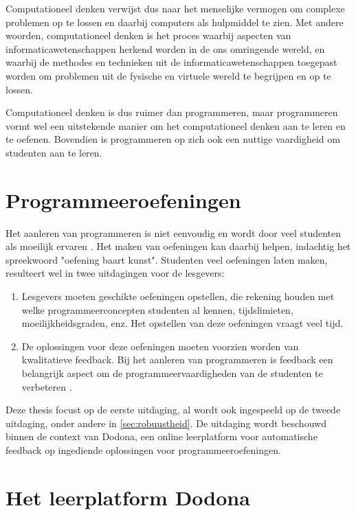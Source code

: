 \begin{displayquote}
    Computationeel denken verwijst dus naar het menselijke vermogen om complexe problemen op te lossen en daarbij computers als hulpmiddel te zien.
    Met andere woorden, computationeel denken is het proces waarbij aspecten van informaticawetenschappen herkend worden in de ons omringende wereld, en waarbij de methodes en technieken uit de informaticawetenschappen toegepast worden om problemen uit de fysische en virtuele wereld te begrijpen en op te lossen.
\end{displayquote}

Computationeel denken is dus ruimer dan programmeren, maar programmeren vormt wel een uitstekende manier om het computationeel denken aan te leren en te oefenen.
Bovendien is programmeren op zich ook een nuttige vaardigheid om studenten aan te leren.

\section{Programmeeroefeningen}\label{sec:programmeeroefeningen}

Het aanleren van programmeren is niet eenvoudig en wordt door veel studenten als moeilijk ervaren \autocite{10.1145/3293881.3295779}.
Het maken van oefeningen kan daarbij helpen, indachtig het spreekwoord "oefening baart kunst".
Studenten veel oefeningen laten maken, resulteert wel in twee uitdagingen voor de lesgevers:
\begin{enumerate}
    \item Lesgevers moeten geschikte oefeningen opstellen, die rekening houden met welke programmeerconcepten studenten al kennen, tijdslimieten, moeilijkheidsgraden, enz.
    Het opstellen van deze oefeningen vraagt veel tijd.
    \item De oplossingen voor deze oefeningen moeten voorzien worden van kwalitatieve feedback.
    Bij het aanleren van programmeren is feedback een belangrijk aspect om de programmeervaardigheden van de studenten te verbeteren \autocite{10.1145/2899415.2899422}.
\end{enumerate}

Deze thesis focust op de eerste uitdaging, al wordt ook ingespeeld op de tweede uitdaging, onder andere in \cref{sec:robuustheid}.
De uitdaging wordt beschouwd binnen de context van Dodona, een online leerplatform voor automatische feedback op ingediende oplossingen voor programmeeroefeningen.

\section{Het leerplatform Dodona}\label{sec:wat-is-dodona}

